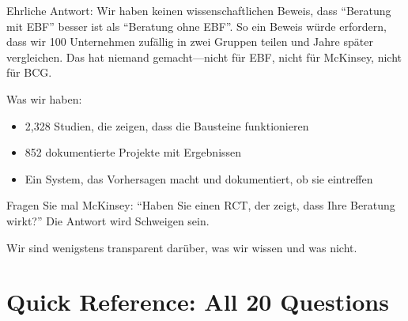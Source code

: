 \begin{tcolorbox}[colback=yellow!5!white, colframe=yellow!75!black,
    title=W3-$\mathcal{P}$-M: Mittel (Praxis)]

Ehrliche Antwort: Wir haben keinen wissenschaftlichen Beweis, dass ``Beratung mit EBF'' besser ist als ``Beratung ohne EBF''. So ein Beweis würde erfordern, dass wir 100 Unternehmen zufällig in zwei Gruppen teilen und Jahre später vergleichen. Das hat niemand gemacht---nicht für EBF, nicht für McKinsey, nicht für BCG.

Was wir haben:
\begin{itemize}[nosep]
    \item 2,328 Studien, die zeigen, dass die Bausteine funktionieren
    \item 852 dokumentierte Projekte mit Ergebnissen
    \item Ein System, das Vorhersagen macht und dokumentiert, ob sie eintreffen
\end{itemize}

Fragen Sie mal McKinsey: ``Haben Sie einen RCT, der zeigt, dass Ihre Beratung wirkt?'' Die Antwort wird Schweigen sein.

Wir sind wenigstens transparent darüber, was wir wissen und was nicht.

\end{tcolorbox}

\section{Quick Reference: All 20 Questions}
\label{sec:da2-quickref}

